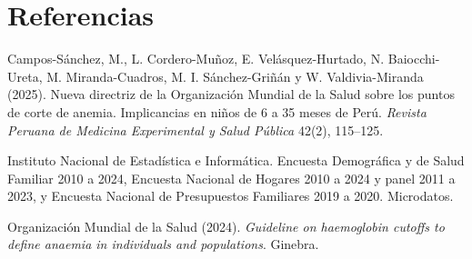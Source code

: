 \documentclass[11pt]{article}
\begin{document}
\section*{Referencias}

\small
\noindent Campos-Sánchez, M., L. Cordero-Muñoz, E. Velásquez-Hurtado, N. Baiocchi-Ureta, M. Miranda-Cuadros, M. I. Sánchez-Griñán y W. Valdivia-Miranda (2025). Nueva directriz de la Organización Mundial de la Salud sobre los puntos de corte de anemia. Implicancias en niños de 6 a 35 meses de Perú. \textit{Revista Peruana de Medicina Experimental y Salud Pública} 42(2), 115--125.

\noindent Instituto Nacional de Estadística e Informática. Encuesta Demográfica y de Salud Familiar 2010 a 2024, Encuesta Nacional de Hogares 2010 a 2024 y panel 2011 a 2023, y Encuesta Nacional de Presupuestos Familiares 2019 a 2020. Microdatos.

\noindent Organización Mundial de la Salud (2024). \textit{Guideline on haemoglobin cutoffs to define anaemia in individuals and populations}. Ginebra.
\end{document}
